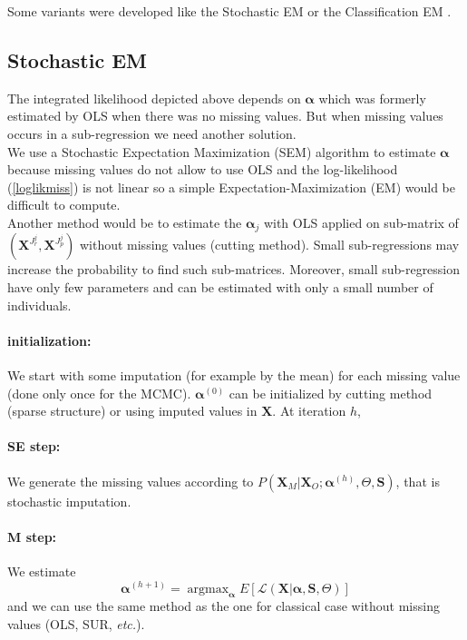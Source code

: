 \documentclass[12pt,a4paper]{report}
\begin{document}
			Some variants were developed like the Stochastic EM \cite{diebolt1996stochastic,celeux1986algorithme} or the Classification EM \cite{celeux1992classification}.
			
			
\subsection{Stochastic EM}
	The integrated likelihood depicted above depends on $\boldsymbol{\alpha}$ which was formerly estimated by OLS when there was no missing values. But when missing values occurs in a sub-regression we need another solution.\\
	
	We use a  Stochastic Expectation Maximization (SEM) algorithm \cite{celeux1986algorithme} to estimate $\boldsymbol{\alpha}$ because missing values do not allow to use OLS and  the log-likelihood (\ref{loglikmiss}) is not linear so a simple Expectation-Maximization (EM) would be difficult to compute.\\
	
	Another method would be to estimate the $\boldsymbol{\alpha}_j$ with OLS applied on sub-matrix of $(\boldsymbol{X}^{J_r^j},\boldsymbol{X}^{J_p^j})$ without missing values (cutting method). Small sub-regressions may increase the probability to find such sub-matrices. Moreover, small sub-regression have only few parameters and can be estimated with only a small number of individuals.
		
	
	\paragraph{initialization:} We start with some imputation (for example by the mean) for each missing value (done only once for the MCMC). $\boldsymbol{\alpha}^{(0)}$ can be initialized by cutting method	(sparse structure) or using imputed values in $\boldsymbol{X}$.
	At iteration $h$,
	\paragraph{SE step:}
		We generate the missing values according to $P(\boldsymbol{X}_M|\boldsymbol{X}_O; \boldsymbol{\alpha}^{(h)},\Theta,\boldsymbol{S})$, that is stochastic imputation.
	\paragraph{M step:}
		We estimate 
		\begin{equation}
	\boldsymbol{\alpha}^{(h+1)}=\operatorname{argmax}_{\boldsymbol{\alpha}}E\left[\mathcal{L}(\boldsymbol{X}|\boldsymbol{\alpha},\boldsymbol{S},\Theta) \right]
\end{equation}
and we can use the same method as the one for classical case without missing values (OLS, SUR, {\it etc.}).\\
\end{document}
